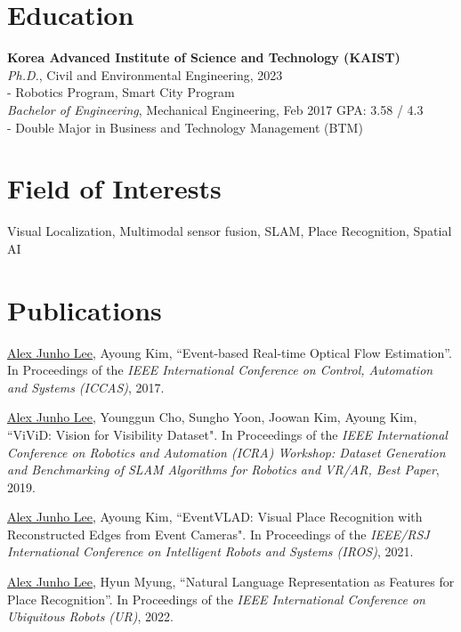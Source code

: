 \documentclass[margin]{res}
\begin{document}
	\begin{resume}
		
		\section{Education}
		\textbf{Korea Advanced Institute of Science and Technology (KAIST)}\\
		{\sl Ph.D.}, Civil and Environmental Engineering, 2023
		\\- Robotics Program, Smart City Program
		\\
		{\sl Bachelor of Engineering}, Mechanical Engineering, Feb 2017
		\hfill GPA: 3.58 / 4.3
		\\- Double Major in Business and Technology Management (BTM)

		\section{Field of Interests}
		Visual Localization, Multimodal sensor fusion, SLAM, Place Recognition, Spatial AI

		\section{Publications}
		\par\underline{Alex Junho Lee}, Ayoung Kim, ``Event-based Real-time Optical Flow Estimation''. In Proceedings of the \textit{IEEE International Conference on Control, Automation and Systems (ICCAS)}, 2017.

		\par\underline{Alex Junho Lee}, Younggun Cho, Sungho Yoon, Joowan Kim, Ayoung Kim, ``ViViD: Vision for Visibility Dataset". In Proceedings of the \textit{IEEE International Conference on Robotics and Automation (ICRA) Workshop: Dataset Generation and Benchmarking of SLAM Algorithms for Robotics and VR/AR, Best Paper}, 2019.
		
		\par\underline{Alex Junho Lee}, Ayoung Kim, ``EventVLAD: Visual Place Recognition with Reconstructed Edges from Event Cameras". In Proceedings of the \textit{IEEE/RSJ International Conference on Intelligent Robots and Systems (IROS)}, 2021.
		
		\par\underline{Alex Junho Lee}, Hyun Myung, ``Natural Language Representation as Features for Place Recognition''. In Proceedings of the \textit{IEEE International Conference on Ubiquitous Robots (UR)}, 2022.
		

\end{resume}
\end{document}
